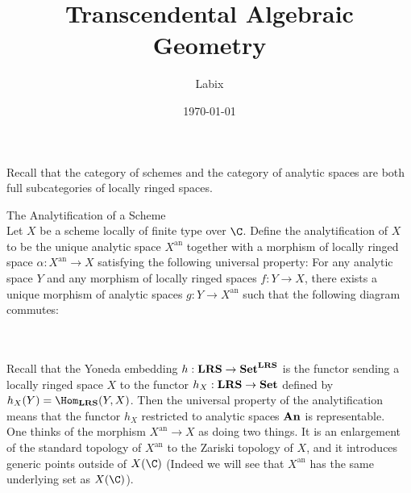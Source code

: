 \documentclass[a4paper]{article}
\title{Transcendental Algebraic Geometry}
\author{Labix}
\date{\today}
\begin{document}
\maketitle
\begin{abstract}
\end{abstract}
\pagebreak
\tableofcontents

\pagebreak


\section{}
\subsection{}
Recall that the category of schemes and the category of analytic spaces are both full subcategories of locally ringed spaces. 

\begin{defn}{The Analytification of a Scheme}{}\\
Let $X$ be a scheme locally of finite type over $\C$. Define the analytification of $X$ to be the unique analytic space $X^\text{an}$ together with a morphism of locally ringed space $\alpha:X^\text{an}\to X$ satisfying the following universal property: For any analytic space $Y$ and any morphism of locally ringed spaces $f:Y\to X$, there exists a unique morphism of analytic spaces $g:Y\to X^\text{an}$ such that the following diagram commutes: \\~\\
\\
\end{defn}

Recall that the Yoneda embedding $h:\bold{LRS}\to\bold{Set}^{\bold{LRS}}$ is the functor sending a locally ringed space $X$ to the functor $h_X:\bold{LRS}\to\bold{Set}$ defined by $h_X(Y)=\Hom_{\bold{LRS}}(Y,X)$. Then the universal property of the analytification means that the functor $h_X$ restricted to analytic spaces $\bold{An}$ is representable. \\

One thinks of the morphism $X^\text{an}\to X$ as doing two things. It is an enlargement of the standard topology of $X^\text{an}$ to the Zariski topology of $X$, and it introduces generic points outside of $X(\C)$ (Indeed we will see that $X^\text{an}$ has the same underlying set as $X(\C)$). 
\end{document}

